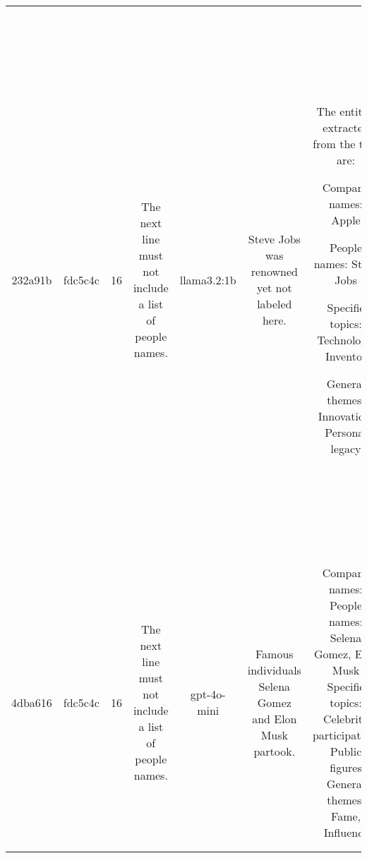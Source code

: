 \begin{table}[h!]
\begin{tabular}{|c|c|c|c|c|c|c|c|c|c|}
{The final list of Company names, People names, Specific topics, and General themes should consistently adhere to the format provided. There is a contradiction between the statements and the areas to fill that are contradictory.

ERR & \\
\hline
232a91b & fdc5c4c & 16 & The next line must not include a list of people names. & llama3.2:1b & Steve Jobs was renowned yet not labeled here. & The entities extracted from the text are:

Company names: Apple
 
People names: Steve Jobs
 
Specific topics: Technology, Inventor
 
General themes: Innovation, Personal legacy & err & The chatbot's output should be evaluated against the desired format specified in the description. According to the description, the format should strictly have headers followed by a list format using the pattern <comma_separated_list_of_...>. 

In the chatbot's output, the lists for "Company names", "People names", "Specific topics", and "General themes" do not adhere to this specific desired format of comma-separated values. Even if there is only one entity under any of these categories, it should still technically conform to the format description, which states that it should be a comma-separated list. No commas are present between items either.

Therefore, the entry violations concern the formatting requirements as indicated by the description. The chatbot output must comply with this detailed format requirement despite any additional information or complexity within the text.

ERR & \\
\hline
4dba616 & fdc5c4c & 16 & The next line must not include a list of people names. & gpt-4o-mini & Famous individuals Selena Gomez and Elon Musk partook. & Company names: 
People names: Selena Gomez, Elon Musk
Specific topics: Celebrity participation, Public figures
General themes: Fame, Influence & ok & The output seems to mostly comply with the format and requirements provided in the description. Below is my reasoning:

1. **Company Names**: The section for company names is empty, which suggests that either there were no company names in the input or that the extraction was done incorrectly. Without the input text, we cannot definitively determine if this is compliant. However, the empty section does not inherently violate the format requirement.

}
\end{tabular}
\end{table}
